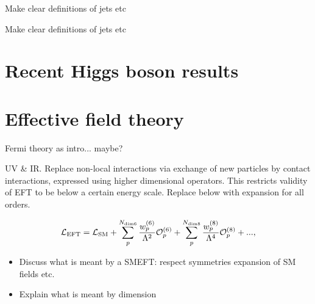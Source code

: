 \begin{table}[htb!]
    \caption[VH leptonic STXS stage 1.2 definitions and fractions]{Make clear definitions of jets etc}
    \label{tab:vh_definitions}
    \centering
    \scriptsize
    \renewcommand{\arraystretch}{1.2}
    \setlength{\tabcolsep}{5pt}
    \hspace*{-5cm}
    
    \hspace*{-5cm}
\end{table}

\begin{table}[htb!]
    \caption[Top-associated and bbH STXS stage 1.2 definitions and fractions]{Make clear definitions of jets etc}
    \label{tab:top_definitions}
    \centering
    \scriptsize
    \renewcommand{\arraystretch}{1.5}
    \setlength{\tabcolsep}{5pt}
    \hspace*{-5cm}
    
    \hspace*{-5cm}
\end{table}

\section{Recent Higgs boson results}

\section{Effective field theory}\label{sec:theory_eft}

Fermi theory as intro... maybe?

UV & IR. Replace non-local interactions via exchange of new particles by contact interactions, expressed using higher dimensional operators. This restricts validity of EFT to be below a certain energy scale. Replace below with expansion for all orders.

\begin{equation}\label{eq:eft_expansion}
    \mathcal{L}_{\rm{EFT}} = \mathcal{L}_{\rm{SM}} + \sum^{N_{\rm{dim6}}}_p \frac{w^{(6)}_p}{\Lambda^2}\mathcal{O}^{(6)}_p + \sum^{N_{\rm{dim8}}}_p \frac{w^{(8)}_p}{\Lambda^4}\mathcal{O}^{(8)}_p + ... ,
\end{equation}

\begin{itemize}
    \item Discuss what is meant by a SMEFT: respect symmetries expansion of SM fields etc.
    \item Explain what is meant by dimension
\end{itemize}

